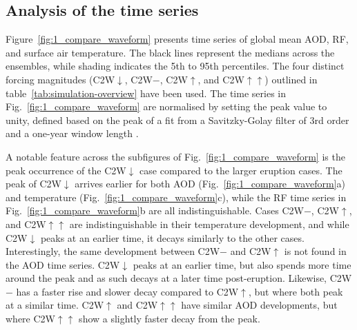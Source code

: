 \documentclass[draft]{agujournal2019}
\begin{document}
  \label{sec:results}


  \subsection{Analysis of the time series}

  Figure~\ref{fig:1_compare_waveform} presents time series of global mean AOD, RF, and
  surface air temperature. The black lines represent the medians across the ensembles,
  while shading indicates the 5th to 95th percentiles. The four distinct forcing
  magnitudes (C2W\(\downarrow\), C2W\(-\), C2W\(\uparrow\), and C2W\(\uparrow\uparrow\))
  outlined in table~\ref{tab:simulation-overview} have been used. The time series in
  Fig.~\ref{fig:1_compare_waveform} are normalised by setting the peak value to unity,
  defined based on the peak of a fit from a Savitzky-Golay filter of 3rd order and a
  one-year window length \cite{savitzky1964}.

  A notable feature across the subfigures of Fig.~\ref{fig:1_compare_waveform} is the
  peak occurrence of the C2W\(\downarrow\) case compared to the larger eruption cases.
  The peak of C2W\(\downarrow\) arrives earlier for both AOD
  (Fig.~\ref{fig:1_compare_waveform}a) and temperature
  (Fig.~\ref{fig:1_compare_waveform}c), while the RF time series in
  Fig.~\ref{fig:1_compare_waveform}b are all indistinguishable. Cases C2W\(-\),
  C2W\(\uparrow\), and C2W\(\uparrow\uparrow\) are indistinguishable in their
  temperature development, and while C2W\(\downarrow\) peaks at an earlier time, it
  decays similarly to the other cases. Interestingly, the same development between
  C2W\(-\) and C2W\(\uparrow\) is not found in the AOD time series. C2W\(\downarrow\)
  peaks at an earlier time, but also spends more time around the peak and as such decays
  at a later time post-eruption. Likewise, C2W\(-\) has a faster rise and slower decay
  compared to C2W\(\uparrow\), but where both peak at a similar time. C2W\(\uparrow\)
  and C2W\(\uparrow\uparrow\) have similar AOD developments, but where
  C2W\(\uparrow\uparrow\) show a slightly faster decay from the peak.
\end{document}
